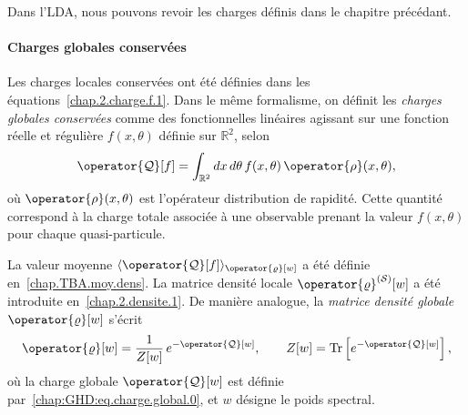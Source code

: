 \medskip

Dans l'\gls{LDA}, nous pouvons revoir les charges définis dans le chapitre précédant.

\begin{mdframed}[
	linewidth=0.5pt, 
	backgroundcolor=gray!5, 
	roundcorner=50pt,	
	innerleftmargin=5pt,
    innerrightmargin=5pt,
    innertopmargin=-10pt,
    innerbottommargin=2pt,
    leftmargin=2pt,
    rightmargin=2pt
	]
\paragraph{Charges globales conservées}  
Les charges locales conservées ont été définies dans les équations~\eqref{chap.2.charge.f.1}.  
Dans le même formalisme, on définit les \emph{charges globales conservées} comme des fonctionnelles linéaires agissant sur une fonction réelle et régulière $f(x,\theta)$ définie sur $\mathbb{R}^2$, selon
\begin{equation}\label{chap:GHD:eq.charge.global.0}
	\operator{\mathcal{Q}}[f] 
	= \int_{\mathbb{R}^2} dx\, d\theta\, f(x, \theta)\, \operator{\rho}(x, \theta),
\end{equation}
où $\operator{\rho}(x,\theta)$ est l'opérateur distribution de rapidité.  
Cette quantité correspond à la charge totale associée à une observable prenant la valeur $f(x,\theta)$ pour chaque quasi-particule.

\medskip

La valeur moyenne $\langle \operator{\mathcal{Q}}[f] \rangle_{\operator{\varrho}[w]}$ a été définie en~\eqref{chap.TBA.moy.dens}.  
La matrice densité locale $\operator{\varrho}^{(\mathcal{S})}[w]$ a été introduite en~\eqref{chap.2.densite.1}.  
De manière analogue, la \emph{matrice densité globale} $\operator{\varrho}[w]$ s’écrit
\begin{equation}\label{chap:GHD:eq.charge.global.2}
	\operator{\varrho}[w] 
	= \frac{1}{Z[w]}\, e^{-\operator{\mathcal{Q}}[w]}, 
	\qquad  
	Z[w] = \mathrm{Tr} \left[ e^{-\operator{\mathcal{Q}}[w]} \right],
\end{equation}
où la charge globale $\operator{\mathcal{Q}}[w]$ est définie par~\eqref{chap:GHD:eq.charge.global.0}, et $w$ désigne le poids spectral.  
\end{mdframed}


